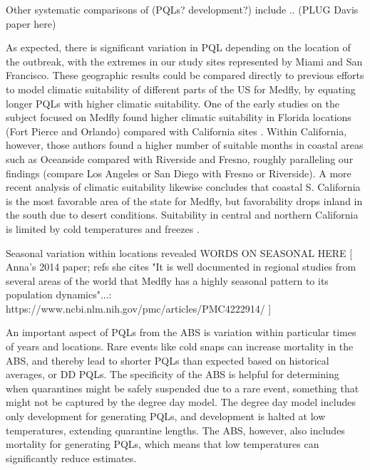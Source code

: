 \documentclass[10pt,a4paper,twocolumn]{article}
\begin{document}
Other systematic comparisons of (PQLs? development?) include .. (PLUG Davis paper here) 


As expected, there is significant variation in PQL depending on the location of the outbreak, 
with the extremes in our study sites represented by Miami and San Francisco.
These geographic results could be
compared directly to previous efforts to model climatic suitability of different parts of the US 
for Medfly, by equating longer PQLs with higher climatic suitability.
One of the early studies on the subject focused on Medfly found higher climatic suitability in 
Florida locations (Fort Pierce and Orlando) compared with California 
sites \cite{messenger_bioclimatic_1954}. 
Within California, however, those authors found a higher number of suitable months in coastal 
areas such as Oceanside compared with Riverside and Fresno, roughly paralleling our 
findings (compare Los Angeles or San Diego with Fresno or Riverside).
A more recent analysis of climatic suitability likewise concludes that coastal 
S. California is the most favorable area of the state for Medfly, but 
favorability drops inland in the south due to desert conditions.
Suitability in central and northern California is limited by cold temperatures and 
freezes \cite{gutierrez_assessing_2011}. 


Seasonal variation within locations revealed WORDS ON SEASONAL HERE
[
Anna's 2014 paper; refs she cites "It is well documented in regional studies from several areas of the world that Medfly has a highly seasonal pattern to its population dynamics"...:
https://www.ncbi.nlm.nih.gov/pmc/articles/PMC4222914/
]


An important aspect of PQLs from the ABS is variation within particular times of years and locations. 
Rare events like cold snaps can increase mortality in the ABS,
and thereby lead to shorter PQLs than expected based on historical averages, or DD PQLs.
The specificity of the ABS is helpful for determining 
when quarantines might be safely suspended due to a rare event,
something that might not be captured by the degree day model.
The degree day model includes only development for generating PQLs,
and development is halted at low temperatures, extending quarantine lengths.
The ABS, however, also includes mortality for generating PQLs,
which means that low temperatures can significantly reduce estimates.
\end{document}
